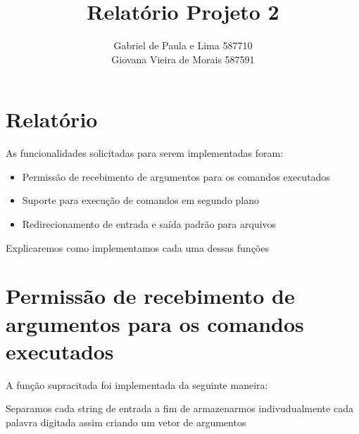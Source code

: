 \documentclass[12pt]{article}
\author{Gabriel de Paula e Lima  587710\\
        Giovana Vieira de Morais  587591}
\title{Relatório Projeto 2}
\begin{document}
\maketitle

\newpage

\section*{Relatório}

As funcionalidades solicitadas para serem implementadas foram:

\begin{itemize}
\item{Permissão de recebimento de argumentos para os comandos executados}
\item{Suporte para execução de comandos em segundo plano}
\item{Redirecionamento de entrada e saída padrão para arquivos}
\end{itemize}

Explicaremos como implementamos cada uma dessas funções

\section*{Permissão de recebimento de argumentos para os comandos executados}
 A função supracitada foi implementada da seguinte maneira:

 Separamos cada string de entrada a fim de armazenarmos indivudualmente cada palavra digitada
 assim criando um vetor de argumentos 




%

\end{document}
